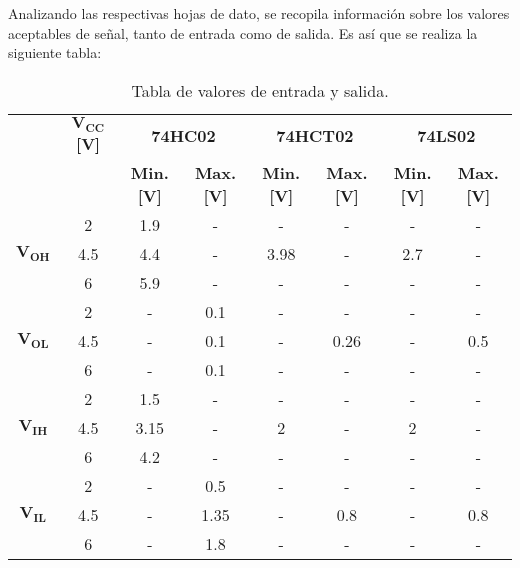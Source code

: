 Analizando las respectivas hojas de dato, se recopila información sobre los  valores aceptables de señal, tanto de entrada como de salida. Es así que se realiza la siguiente tabla:
\begin{table}[H]
\centering
\begin{tabular}{c|c|c|c|c|c|c|c|}
\cline{2-8}
                               & $\mathbf{V_{CC}}$ \textbf{[V]} & \multicolumn{2}{c|}{\textbf{74HC02}}  & \multicolumn{2}{c|}{\textbf{74HCT02}} & \multicolumn{2}{c|}{\textbf{74LS02}} \\ \cline{3-8} 
                               &              & \textbf{Min. [V]} & \textbf{Max. [V]} & \textbf{Min. [V]} & \textbf{Max. [V]} & \textbf{Min. [V]} & \textbf{Max. [V]}	\\ \hline
\multicolumn{1}{|c|}{}         & 2            & 1.9           & -            & -             & -            & -          & -            \\  
\multicolumn{1}{|c|}{$\mathbf{V_{OH}}$} & 4.5          & 4.4           & -            & 3.98          & -            & 2.7            & -            \\  
\multicolumn{1}{|c|}{}         & 6            & 5.9           & -            & -             & -            & -            & -            \\ \hline
\multicolumn{1}{|c|}{}         & 2            & -             & 0.1          & -             & -            & -            & -          \\
\multicolumn{1}{|c|}{$\mathbf{V_{OL}}$} & 4.5          & -             & 0.1          & -             & 0.26         & -            & 0.5            \\
\multicolumn{1}{|c|}{}         & 6            & -             & 0.1          & -             & -            & -            & -            \\ \hline
\multicolumn{1}{|c|}{}         & 2            & 1.5           & -            & -             & -            & -            & -            \\ 
\multicolumn{1}{|c|}{$\mathbf{V_{IH}}$}  & 4.5          & 3.15          & -            & 2             & -            & 2            & -            \\ 
\multicolumn{1}{|c|}{}         & 6            & 4.2           & -            & -             & -            & -            & -            \\ \hline
\multicolumn{1}{|c|}{}         & 2            & -             & 0.5          & -             & -            & -            & -            \\ 
\multicolumn{1}{|c|}{$\mathbf{V_{IL}}$} & 4.5          & -             & 1.35         & -             & 0.8          & -            & 0.8          \\ 
\multicolumn{1}{|c|}{}         & 6            & -             & 1.8          & -             & -            & -            & -            \\ \hline
\end{tabular}
\centering
\caption{Tabla de valores de entrada y salida.}
\label{tabla:vinout}
\end{table}

